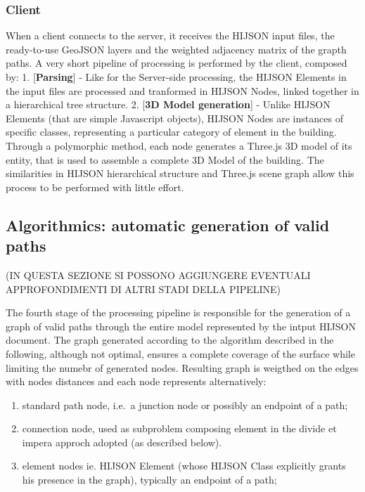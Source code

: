 \documentclass{sig-alternate}
\begin{document}
\subsubsection{Client}\label{client}

When a client connects to the server, it receives the HIJSON input
files, the ready-to-use GeoJSON layers and the weighted adjacency matrix
of the grapth paths. A very short pipeline of processing is performed by
the client, composed by: 1. {[}\textbf{Parsing}{]} - Like for the
Server-side processing, the HIJSON Elements in the input files are
processed and tranformed in HIJSON Nodes, linked together in a
hierarchical tree structure. 2. {[}\textbf{3D Model generation}{]} -
Unlike HIJSON Elements (that are simple Javascript objects), HIJSON
Nodes are instances of specific classes, representing a particular
category of element in the building. Through a polymorphic method, each
node generates a Three.js 3D model of its entity, that is used to
assemble a complete 3D Model of the building. The similarities in HIJSON
hierarchical structure and Three.js scene graph allow this process to be
performed with little effort.

\subsection{Algorithmics: automatic generation of valid
paths}\label{algorithmics-automatic-generation-of-valid-paths}


(IN QUESTA SEZIONE SI POSSONO AGGIUNGERE EVENTUALI APPROFONDIMENTI DI
ALTRI STADI DELLA PIPELINE)

The fourth stage of the processing pipeline is responsible for the
generation of a graph of valid paths through the entire model
represented by the intput HIJSON document. The graph generated according
to the algorithm described in the following, although not optimal,
ensures a complete coverage of the surface while limiting the numebr of
generated nodes. Resulting graph is weigthed on the edges with nodes
distances and each node represents alternatively:

\begin{enumerate}
\def\labelenumi{\alph{enumi}.}
\itemsep1pt\parskip0pt
\item
  standard path node, i.e.~a junction node or possibly an endpoint of a
  path;
\item
  connection node, used as subproblem composing element in the divide et
  impera approch adopted (as described below).
\item
  element nodes ie. HIJSON Element (whose HIJSON Class explicitly grants
  his presence in the graph), typically an endpoint of a path;
\end{enumerate}
\end{document}
